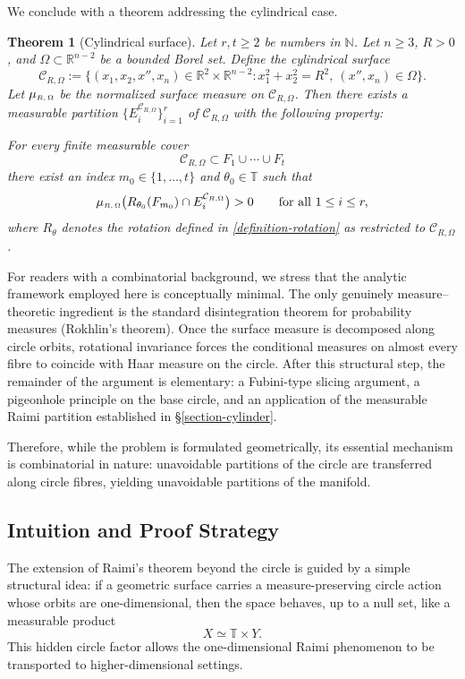 \documentclass[11pt]{article}
\numberwithin{equation}{section}
\newtheorem{theorem}{Theorem}[section]
\theoremstyle{remark}
\begin{document}
We conclude with a theorem addressing the cylindrical case.
\begin{theorem}[Cylindrical surface]\label{thm:cylinder-Raimi}
Let $r, t\ge 2$ be numbers in $\mathbb{N}$. 
Let $n\ge 3$, $R>0$, and $\Omega\subset\mathbb{R}^{n-2}$ be a bounded Borel set. Define the cylindrical surface
\[
\mathcal{C}_{R,\Omega}
:= \big\{(x_1,x_2, x'', x_n)\in\mathbb{R}^2\times\mathbb{R}^{n-2}
 : x_1^2+x_2^2=R^2,\ (x'', x_n)\in\Omega\big\}.
\]
Let $\mu_{\text{\tiny $R,\Omega$}}$ be the normalized surface measure on $\mathcal{C}_{R,\Omega}$.
Then there exists a measurable partition $\{E_i^{\mathcal{C}_{R,\Omega}}\}_{i=1}^r$ of $\mathcal{C}_{R,\Omega}$ with the following property:

For every finite measurable cover
\[
\mathcal{C}_{R,\Omega} \subset F_1\cup\cdots\cup F_t
\]
there exist an index $m_0\in\{1,\dots,t\}$ and $\theta_0\in \mathbb{T}$ such that
\[
\mu_{\text{\tiny $R,\Omega$}}\big(R_{\theta_0}(F_{m_0})\cap E_i^{\mathcal{C}_{R,\Omega}}\big)>0
\qquad\text{for all }1\le i\le r,
\]
where $R_\theta$ denotes the rotation defined in \eqref{definition-rotation} as restricted to $\mathcal{C}_{R,\Omega}$.
\end{theorem}


For readers with a combinatorial background, we stress that the analytic framework employed here is conceptually minimal. The only genuinely measure–theoretic ingredient is the standard disintegration theorem for probability measures (Rokhlin’s theorem). Once the surface measure is decomposed along circle orbits, rotational invariance forces the conditional measures on almost every fibre to coincide with Haar measure on the circle. After this structural step, the remainder of the argument is elementary: a Fubini-type slicing argument, a pigeonhole principle on the base circle, and an application of the measurable Raimi partition established in \S\ref{section-cylinder}.

Therefore, while the problem is formulated geometrically, its essential mechanism is combinatorial in nature: unavoidable partitions of the circle are transferred along circle fibres, yielding unavoidable partitions of the manifold.


\subsection{Intuition and Proof Strategy}


The extension of Raimi's theorem beyond the circle is guided by a simple structural idea: if a geometric surface carries a measure-preserving circle action whose orbits are one-dimensional, then the space behaves, up to a null set, like a measurable product
\[
X \simeq \mathbb{T} \times Y.
\]
This hidden circle factor allows the one-dimensional Raimi phenomenon to be transported to higher-dimensional settings.
\end{document}
